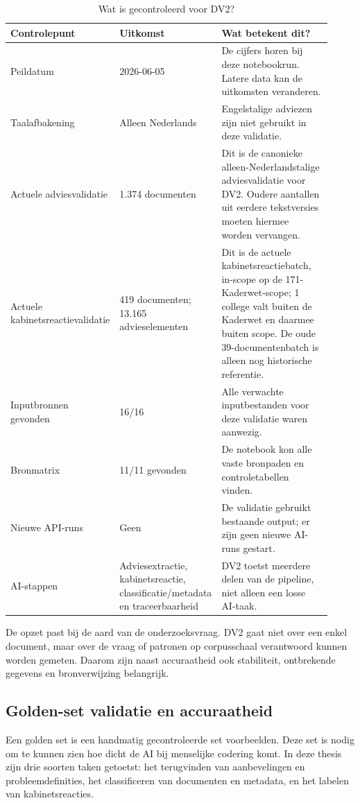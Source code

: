 \begin{table}[htbp]
\centering
\small
\caption{Wat is gecontroleerd voor DV2?}
\label{tab:dv2-validatieopzet}
\begin{tabular}{p{0.28\linewidth}p{0.24\linewidth}p{0.40\linewidth}}
\hline
Controlepunt & Uitkomst & Wat betekent dit? \\
\hline
Peildatum & 2026-06-05 & De cijfers horen bij deze notebookrun. Latere data kan de uitkomsten veranderen. \\
Taalafbakening & Alleen Nederlands & Engelstalige adviezen zijn niet gebruikt in deze validatie. \\
Actuele adviesvalidatie & 1.374 documenten & Dit is de canonieke alleen-Nederlandstalige adviesvalidatie voor DV2. Oudere aantallen uit eerdere tekstversies moeten hiermee worden vervangen. \\
Actuele kabinetsreactievalidatie & 419 documenten; 13.165 advieselementen & Dit is de actuele kabinetsreactiebatch, in-scope op de 171-Kaderwet-scope; 1 college valt buiten de Kaderwet en daarmee buiten scope. De oude 39-documentenbatch is alleen nog historische referentie. \\
Inputbronnen gevonden & 16/16 & Alle verwachte inputbestanden voor deze validatie waren aanwezig. \\
Bronmatrix & 11/11 gevonden & De notebook kon alle vaste bronpaden en controletabellen vinden. \\
Nieuwe API-runs & Geen & De validatie gebruikt bestaande output; er zijn geen nieuwe AI-runs gestart. \\
AI-stappen & Adviesextractie, kabinetsreactie, classificatie/metadata en traceerbaarheid & DV2 toetst meerdere delen van de pipeline, niet alleen een losse AI-taak. \\
\hline
\end{tabular}
\end{table}

De opzet past bij de aard van de onderzoeksvraag. DV2 gaat niet over een enkel document, maar over de vraag of patronen op corpusschaal verantwoord kunnen worden gemeten. Daarom zijn naast accuraatheid ook stabiliteit, ontbrekende gegevens en bronverwijzing belangrijk.

\subsection{Golden-set validatie en accuraatheid}
\label{subsec:dv2-golden-set-validatie}

Een golden set is een handmatig gecontroleerde set voorbeelden. Deze set is nodig om te kunnen zien hoe dicht de AI bij menselijke codering komt. In deze thesis zijn drie soorten taken getoetst: het terugvinden van aanbevelingen en probleemdefinities, het classificeren van documenten en metadata, en het labelen van kabinetsreacties.

